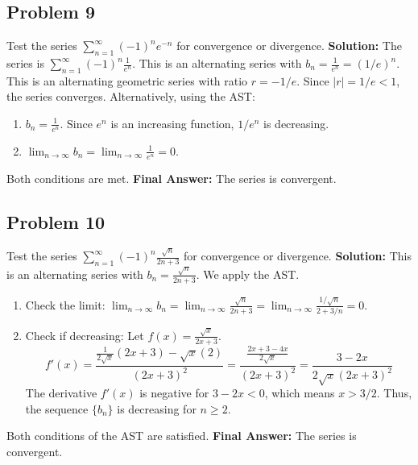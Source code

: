 \documentclass{article}
\begin{document}
\subsection*{Problem 9}
Test the series $\sum_{n=1}^{\infty} (-1)^n e^{-n}$ for convergence or divergence.
\textbf{Solution:} The series is $\sum_{n=1}^{\infty} (-1)^n \frac{1}{e^n}$. This is an alternating series with $b_n = \frac{1}{e^n} = (1/e)^n$. This is an alternating geometric series with ratio $r = -1/e$. Since $|r| = 1/e < 1$, the series converges.
Alternatively, using the AST:
\begin{enumerate}
    \item $b_n = \frac{1}{e^n}$. Since $e^n$ is an increasing function, $1/e^n$ is decreasing.
    \item $\lim_{n \to \infty} b_n = \lim_{n \to \infty} \frac{1}{e^n} = 0$.
\end{enumerate}
Both conditions are met.
\textbf{Final Answer:} The series is convergent.

\subsection*{Problem 10}
Test the series $\sum_{n=1}^{\infty} (-1)^n \frac{\sqrt{n}}{2n+3}$ for convergence or divergence.
\textbf{Solution:} This is an alternating series with $b_n = \frac{\sqrt{n}}{2n+3}$. We apply the AST.
\begin{enumerate}
    \item Check the limit: $\lim_{n \to \infty} b_n = \lim_{n \to \infty} \frac{\sqrt{n}}{2n+3} = \lim_{n \to \infty} \frac{1/\sqrt{n}}{2+3/n} = 0$.
    \item Check if decreasing: Let $f(x) = \frac{\sqrt{x}}{2x+3}$.
    \[ f'(x) = \frac{\frac{1}{2\sqrt{x}}(2x+3) - \sqrt{x}(2)}{(2x+3)^2} = \frac{\frac{2x+3 - 4x}{2\sqrt{x}}}{(2x+3)^2} = \frac{3-2x}{2\sqrt{x}(2x+3)^2} \]
    The derivative $f'(x)$ is negative for $3-2x < 0$, which means $x > 3/2$. Thus, the sequence $\{b_n\}$ is decreasing for $n \ge 2$.
\end{enumerate}
Both conditions of the AST are satisfied.
\textbf{Final Answer:} The series is convergent.
\end{document}
